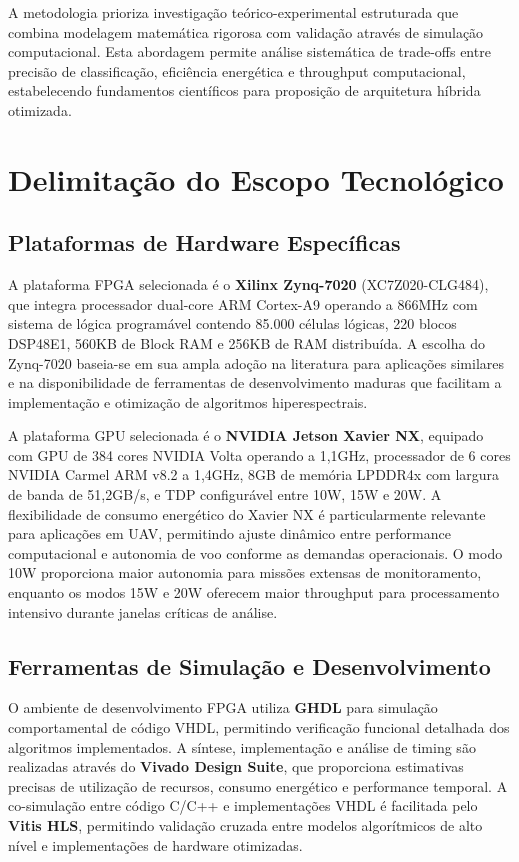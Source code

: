 A metodologia prioriza investigação teórico-experimental estruturada que combina 
modelagem matemática rigorosa com validação através de simulação computacional. 
Esta abordagem permite análise sistemática de trade-offs entre precisão de 
classificação, eficiência energética e throughput computacional, estabelecendo 
fundamentos científicos para proposição de arquitetura híbrida otimizada.

\section{Delimitação do Escopo Tecnológico}\label{sec:delimitacao_escopo}

\subsection{Plataformas de Hardware Específicas}\label{subsec:plataformas_hardware}

A plataforma FPGA selecionada é o \textbf{Xilinx Zynq-7020} (XC7Z020-CLG484), 
que integra processador dual-core ARM Cortex-A9 operando a 866MHz com sistema 
de lógica programável contendo 85.000 células lógicas, 220 blocos DSP48E1, 
560KB de Block RAM e 256KB de RAM distribuída. A escolha do Zynq-7020 baseia-se em sua 
ampla adoção na literatura para aplicações similares e na disponibilidade de 
ferramentas de desenvolvimento maduras que facilitam a implementação e 
otimização de algoritmos hiperespectrais.

A plataforma GPU selecionada é o \textbf{NVIDIA Jetson Xavier NX}, equipado 
com GPU de 384 cores NVIDIA Volta operando a 1,1GHz, processador de 6 cores 
NVIDIA Carmel ARM v8.2 a 1,4GHz, 8GB de memória LPDDR4x com largura de banda 
de 51,2GB/s, e TDP configurável entre 10W, 15W e 20W. A flexibilidade de consumo 
energético do Xavier NX é particularmente relevante para aplicações em UAV, 
permitindo ajuste dinâmico entre performance computacional e autonomia de voo 
conforme as demandas operacionais. O modo 10W proporciona maior autonomia para 
missões extensas de monitoramento, enquanto os modos 15W e 20W oferecem maior 
throughput para processamento intensivo durante janelas críticas de análise.

\subsection{Ferramentas de Simulação e Desenvolvimento}\label{subsec:ferramentas}

O ambiente de desenvolvimento FPGA utiliza \textbf{GHDL} para simulação 
comportamental de código VHDL, permitindo verificação funcional detalhada dos 
algoritmos implementados. A síntese, implementação e análise de timing são 
realizadas através do \textbf{Vivado Design Suite}, que proporciona 
estimativas precisas de utilização de recursos, consumo energético e 
performance temporal. A co-simulação entre código C/C++ e implementações VHDL 
é facilitada pelo \textbf{Vitis HLS}, permitindo validação cruzada 
entre modelos algorítmicos de alto nível e implementações de hardware 
otimizadas.

